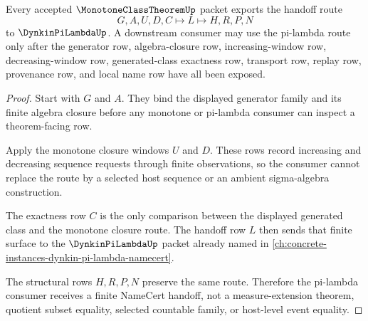 \begin{theorem}
\label{thm:monotone-class-theorem-pi-lambda-handoff}
Every accepted $\MonotoneClassTheoremUp$ packet exports the handoff route
$$
G,A,U,D,C \longmapsto L \longmapsto H,R,P,N
$$
to $\DynkinPiLambdaUp$. A downstream consumer may use the pi-lambda route only after the generator row, algebra-closure row, increasing-window row, decreasing-window row, generated-class exactness row, transport row, replay row, provenance row, and local name row have all been exposed.
\end{theorem}
\begin{proof}
Start with $G$ and $A$. They bind the displayed generator family and its finite algebra closure before any monotone or pi-lambda consumer can inspect a theorem-facing row.

Apply the monotone closure windows $U$ and $D$. These rows record increasing and decreasing sequence requests through finite observations, so the consumer cannot replace the route by a selected host sequence or an ambient sigma-algebra construction.

The exactness row $C$ is the only comparison between the displayed generated class and the monotone closure route. The handoff row $L$ then sends that finite surface to the $\DynkinPiLambdaUp$ packet already named in \autoref{ch:concrete-instances-dynkin-pi-lambda-namecert}.

The structural rows $H,R,P,N$ preserve the same route. Therefore the pi-lambda consumer receives a finite NameCert handoff, not a measure-extension theorem, quotient subset equality, selected countable family, or host-level event equality.
\end{proof}

\begin{closurestatus}{\MonotoneClassTheoremUp}
  \theoryclosure{\seedClosure}
  \formalstatus{\unformalizedV}
\end{closurestatus}
